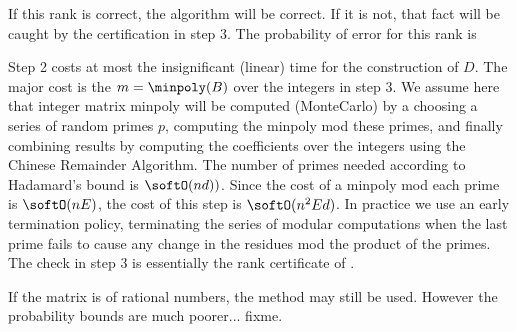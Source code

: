 If this rank is correct, the algorithm will be correct.  If it is not,
that fact will be caught by the certification in step 3.  The probability
of error for this rank is 

Step 2 costs at most the insignificant (linear) time for the construction of $D$.  
The major cost is the $m = \minpoly(B)$ over the integers in step 3.
We assume here that integer matrix minpoly will be computed (MonteCarlo)
by a choosing a series of random primes $p$, computing the minpoly mod
these primes, and finally combining results by computing the coefficients
over the integers using the Chinese Remainder Algorithm.  The number
of primes needed according to Hadamard's bound is $\softO(n d))$.
Since the cost of a minpoly mod each prime is $\softO(nE)$, the cost of this
step is $\softO(n^2 E d)$.
In practice we use an early termination policy, terminating the series 
of modular computations when the last prime fails to cause any change in 
the residues mod the product of the primes.
The check in step 3 is essentially the rank certificate of \cite{SSV04}.
\QED

If the matrix is of rational numbers, the method may still be used.  However
the probability bounds are much poorer... fixme.


